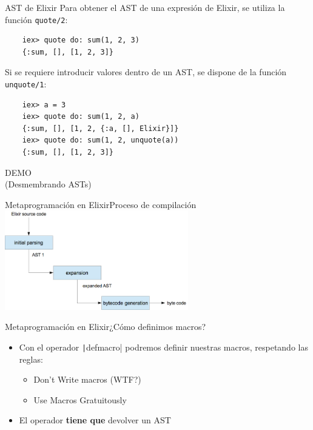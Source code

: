 \documentclass[14pt,aspectratio=169]{beamer}
\begin{document}
\begin{frame}[fragile]{AST de Elixir}
  Para obtener el AST de una expresión de Elixir, se utiliza la función
  \texttt{quote/2}:
  \footnotesize  \begin{verbatim}
    iex> quote do: sum(1, 2, 3)
    {:sum, [], [1, 2, 3]}
  \end{verbatim}
  \normalsize Si se requiere introducir valores dentro de un AST, se dispone de la función
  \texttt{unquote/1}:
  \footnotesize \begin{verbatim}
    iex> a = 3
    iex> quote do: sum(1, 2, a)
    {:sum, [], [1, 2, {:a, [], Elixir}]}
    iex> quote do: sum(1, 2, unquote(a))
    {:sum, [], [1, 2, 3]}
  \end{verbatim}
\end{frame}

\begin{frame}
  \centering
  \huge
  DEMO\\
  \large
  (Desmembrando ASTs)
\end{frame}

\begin{frame}{Metaprogramación en Elixir}{Proceso de compilación}
  \centering
  \includegraphics[width=0.6\textwidth]{compilation_process.png}
\end{frame}

\begin{frame}{Metaprogramación en Elixir}{¿Cómo definimos macros?}
  \begin{itemize}
    \item Con el operador \texttt|defmacro| podremos definir
    nuestras macros, respetando las reglas\footnotemark[2]:
    \begin{itemize}
      \item Don't Write macros (WTF?)
      \item Use Macros Gratuitously
    \end{itemize}
    \item El operador \textbf{tiene que} devolver un AST
  \end{itemize}
\end{frame}
\end{document}
